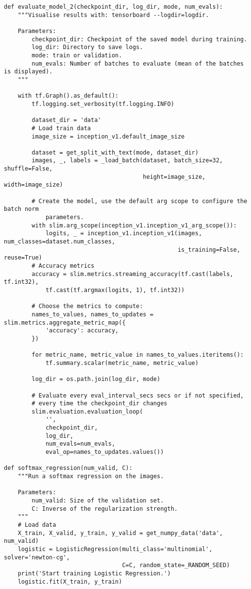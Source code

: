 \begin{lstlisting}
def evaluate_model_2(checkpoint_dir, log_dir, mode, num_evals):
    """Visualise results with: tensorboard --logdir=logdir. 
    
    Parameters:
        checkpoint_dir: Checkpoint of the saved model during training.
        log_dir: Directory to save logs.
        mode: train or validation.
        num_evals: Number of batches to evaluate (mean of the batches is displayed).
    """
    
    with tf.Graph().as_default():
        tf.logging.set_verbosity(tf.logging.INFO)

        dataset_dir = 'data'
        # Load train data
        image_size = inception_v1.default_image_size

        dataset = get_split_with_text(mode, dataset_dir)
        images, _, labels = _load_batch(dataset, batch_size=32, shuffle=False, 
                                        height=image_size, width=image_size)

        # Create the model, use the default arg scope to configure the batch norm 
            parameters.
        with slim.arg_scope(inception_v1.inception_v1_arg_scope()):
            logits, _ = inception_v1.inception_v1(images, num_classes=dataset.num_classes, 
                                                  is_training=False, reuse=True)
        # Accuracy metrics
        accuracy = slim.metrics.streaming_accuracy(tf.cast(labels, tf.int32),
            tf.cast(tf.argmax(logits, 1), tf.int32))

        # Choose the metrics to compute:
        names_to_values, names_to_updates = slim.metrics.aggregate_metric_map({
            'accuracy': accuracy,
        })

        for metric_name, metric_value in names_to_values.iteritems():
            tf.summary.scalar(metric_name, metric_value)

        log_dir = os.path.join(log_dir, mode)

        # Evaluate every eval_interval_secs secs or if not specified,
        # every time the checkpoint_dir changes
        slim.evaluation.evaluation_loop(
            '',
            checkpoint_dir,
            log_dir,
            num_evals=num_evals,
            eval_op=names_to_updates.values())
        
def softmax_regression(num_valid, C):
    """Run a softmax regression on the images.

    Parameters:
        num_valid: Size of the validation set.
        C: Inverse of the regularization strength.
    """
    # Load data
    X_train, X_valid, y_train, y_valid = get_numpy_data('data', num_valid)
    logistic = LogisticRegression(multi_class='multinomial', solver='newton-cg',
                                  C=C, random_state=_RANDOM_SEED)
    print('Start training Logistic Regression.')
    logistic.fit(X_train, y_train)


\end{lstlisting}
